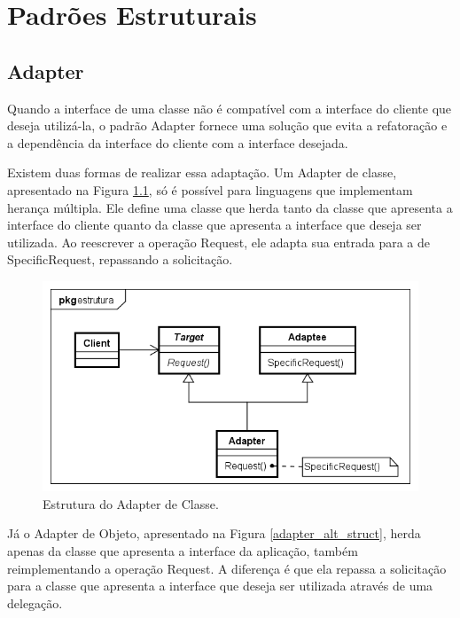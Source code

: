 \chapter{Padrões Estruturais}

\section{Adapter}

Quando a interface de uma classe não 
é compatível com a interface do cliente que deseja 
utilizá-la, o padrão Adapter fornece uma 
solução que evita a refatoração e a dependência da 
interface do cliente com a interface desejada.\cite{gamma:1995}

Existem duas formas de realizar essa adaptação. Um Adapter 
de classe, apresentado na Figura \ref{adapter_struct},  
só é possível para linguagens que implementam herança 
múltipla.
Ele define uma classe que herda tanto da classe que 
apresenta a interface do cliente quanto da classe que 
apresenta a interface que deseja ser utilizada. Ao 
reescrever a operação Request, ele adapta sua entrada 
para a de SpecificRequest, repassando a solicitação.\cite{gamma:1995}

\begin{figure}[htb]
	\caption{\label{adapter_struct}Estrutura do Adapter de Classe.}
	\begin{center}
	    \includegraphics[scale=0.5]{5_padroes-contexto-funcional/5.2_estruturais/5.2.1_adapter/adapter_classe_estrutura.png}
	\end{center}
\end{figure}

Já o Adapter de Objeto, apresentado na Figura \ref{adapter_alt_struct}, 
herda apenas da classe que apresenta a interface 
da aplicação, também reimplementando a operação Request. 
A diferença é que ela repassa a solicitação para a 
classe que apresenta a interface que deseja ser 
utilizada através de uma delegação.\cite{gamma:1995}


